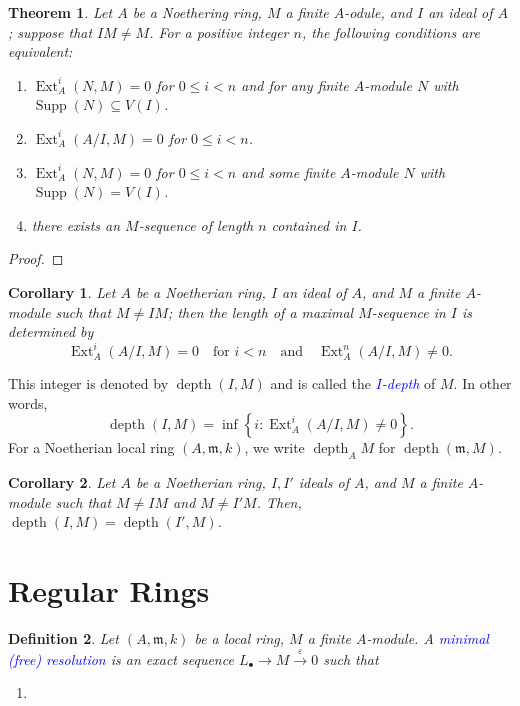 \documentclass[12pt]{article}
\theoremstyle{thmstyle}
\newtheorem{theorem}{Theorem}[section]
\theoremstyle{defstyle}
\newtheorem{definition}[theorem]{Definition}
\newtheorem*{corollary}{Corollary}
\newcommand{\Supp}{\operatorname{Supp}}
\newcommand{\frakm}{\mathfrak{m}} %
\newcommand{\define}[1]{\textcolor{blue}{\textit{#1}}}
\renewcommand{\le}{\leqslant}
\newcommand{\Ext}{\operatorname{Ext}}
\newcommand{\depth}{\operatorname{depth}}
\begin{document}
\begin{theorem}
    Let $A$ be a Noethering ring, $M$ a finite $A$-odule, and $I$ an ideal of $A$; suppose that $IM\ne M$. For a positive integer $n$, the following conditions are equivalent: 
    \begin{enumerate}[label=(\alph*)]
        \item $\Ext^i_A(N, M) = 0$ for $0\le i < n$ and for any finite $A$-module $N$ with $\Supp(N)\subseteq V(I)$. 
        \item $\Ext^i_A(A/I, M) = 0$ for $0\le i < n$. 
        \item $\Ext^i_A(N, M) = 0$ for $0\le i < n$ and \emph{some} finite $A$-module $N$ with $\Supp(N) = V(I)$. 
        \item there exists an $M$-sequence of length $n$ contained in $I$.
    \end{enumerate}
\end{theorem}
\begin{proof}
\end{proof}

\begin{corollary}
    Let $A$ be a Noetherian ring, $I$ an ideal of $A$, and $M$ a finite $A$-module such that $M\ne IM$; then the length of a maximal $M$-sequence in $I$ is determined by 
    \begin{equation*}
        \Ext^i_A(A/I, M) = 0\quad\text{for } i < n\quad\text{and}\quad\Ext^n_A(A/I, M)\ne 0.
    \end{equation*}
\end{corollary}

This integer is denoted by $\depth(I, M)$ and is called the \define{$I$-depth} of $M$. In other words, 
\begin{equation*}
    \depth(I, M) = \inf\left\{i\colon\Ext^i_A(A/I, M)\ne 0\right\}.
\end{equation*}
For a Noetherian local ring $(A,\frakm, k)$, we write $\depth_A M$ for $\depth(\frakm, M)$.

\begin{corollary}
    Let $A$ be a Noetherian ring, $I, I'$ ideals of $A$, and $M$ a finite $A$-module such that $M\ne IM$ and $M\ne I'M$. Then, $\depth(I, M) = \depth(I', M)$.
\end{corollary}

\section{Regular Rings}

\begin{definition}
    Let $(A,\frakm, k)$ be a local ring, $M$ a finite $A$-module. A \define{minimal (free) resolution} is an exact sequence $L_\bullet\to M\xrightarrow{\varepsilon} 0$ such that 
    \begin{enumerate}[label=(\alph*)]
        \item 
    \end{enumerate}
\end{definition}
\end{document}
